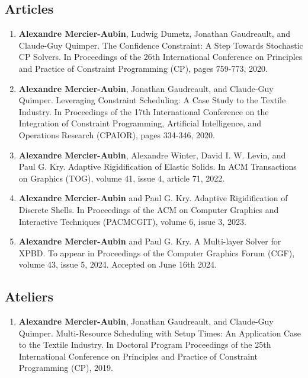 \documentclass[10pt]{article} %
\begin{document}
\subsection{Articles}
%
%
\begin{enumerate}
  \setcounter{enumi}{\value{listCounter}}
  \item \textbf{Alexandre Mercier-Aubin}, Ludwig Dumetz, Jonathan Gaudreault, and Claude-Guy Quimper. The Confidence Constraint: A Step Towards Stochastic CP Solvers. In Proceedings of the 26th International Conference on Principles and Practice of Constraint Programming (CP), pages 759-773, 2020. 

 \item \textbf{Alexandre Mercier-Aubin}, Jonathan Gaudreault, and Claude-Guy Quimper. Leveraging Constraint Scheduling: A Case Study to the Textile Industry. In Proceedings of the 17th International Conference on the Integration of Constraint Programming, Artificial Intelligence, and Operations Research (CPAIOR), pages 334-346, 2020. 

 \item \textbf{Alexandre Mercier-Aubin},  Alexandre Winter,  David I. W. Levin, and Paul G. Kry. Adaptive Rigidification of Elastic Solids. In ACM Transactions on Graphics (TOG), volume 41, issue 4, article 71, 2022.  

 \item \textbf{Alexandre Mercier-Aubin} and Paul G. Kry. Adaptive Rigidification of Discrete Shells. In Proceedings of the ACM on Computer Graphics and Interactive Techniques (PACMCGIT), volume 6, issue 3, 2023. 

\item \textbf{Alexandre Mercier-Aubin} and Paul G. Kry. A Multi-layer Solver for XPBD. To appear in Proceedings of the Computer Graphics Forum (CGF), volume 43, issue 5, 2024. Accepted on June 16th 2024. 
\end{enumerate}

\subsection{Ateliers}
\begin{enumerate}
  \setcounter{enumi}{\value{listCounter}}
  \item \textbf{Alexandre Mercier-Aubin}, Jonathan Gaudreault, and Claude-Guy Quimper. Multi-Resource Scheduling with Setup Times:
An Application Case to the Textile Industry. In  Doctoral Program Proceedings of the 25th International
Conference on Principles and Practice of Constraint Programming (CP), 2019. 

\end{enumerate}
\end{document}
